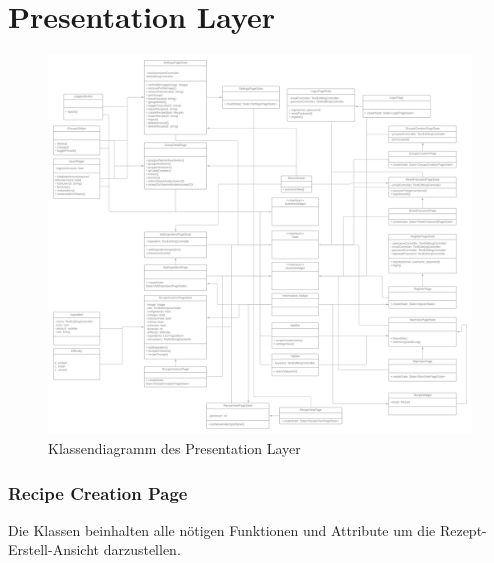 \documentclass[parskip=full]{scrartcl}
\begin{document}
\section{Presentation Layer}
\begin{figure}[htp]
    \centering
    \includegraphics[width = \textwidth]{images/presentationLayer/presentationLayer.png}
    \caption{Klassendiagramm des Presentation Layer}
    \label{fig:presentation-layer}
\end{figure}

\newpage
\subsubsection{Recipe Creation Page}
Die Klassen beinhalten alle nötigen Funktionen und Attribute um die Rezept-Erstell-Ansicht darzustellen.\newline
\end{document}
